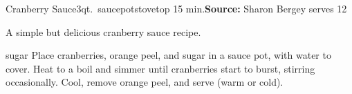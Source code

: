 \begin{recipe}{Cranberry Sauce}{3qt.\ saucepot\hfill stovetop \hfill 15 min.}{\textbf{Source:} Sharon Bergey \hfill serves 12}

 \freeform A simple but delicious cranberry sauce recipe.

  {sugar}
 Place cranberries, orange peel, and sugar in a sauce pot, with water to cover.
 \newstep Heat to a boil and simmer until cranberries start to burst, stirring occasionally.
 \newstep Cool, remove orange peel, and serve (warm or cold).

\end{recipe}
